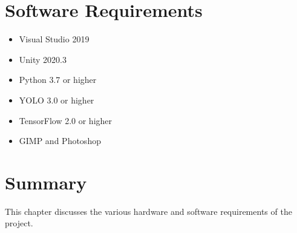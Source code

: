 \documentclass[openany,12pt]{report}
\begin{document}
	\section{Software Requirements}
	\begin{itemize}
		\item{Visual Studio 2019}
		\item{Unity 2020.3}
		\item{Python 3.7 or higher}
		\item{YOLO 3.0 or higher}
		\item{TensorFlow 2.0 or higher}
		\item{GIMP and Photoshop}
	\end{itemize}
	
	\section{Summary}
	\hspace*{0.5in}This chapter discusses the various hardware and software requirements of the project.

\end{document}
